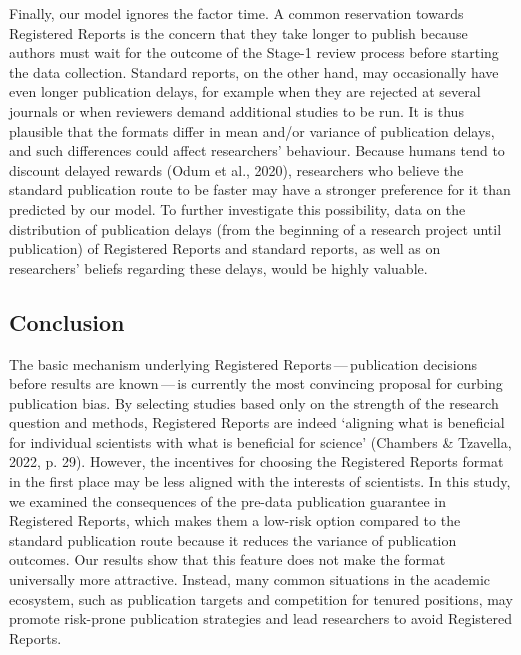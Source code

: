 \documentclass[
  ,man,mask,floatsintext]{apa6}
\begin{document}
Finally, our model ignores the factor time.
A common reservation towards Registered Reports is the concern that they take longer to publish because authors must wait for the outcome of the Stage-1 review process before starting the data collection.
Standard reports, on the other hand, may occasionally have even longer publication delays, for example when they are rejected at several journals or when reviewers demand additional studies to be run.
It is thus plausible that the formats differ in mean and/or variance of publication delays, and such differences could affect researchers' behaviour.
Because humans tend to discount delayed rewards (Odum et al., 2020), researchers who believe the standard publication route to be faster may have a stronger preference for it than predicted by our model.
To further investigate this possibility, data on the distribution of publication delays (from the beginning of a research project until publication) of Registered Reports and standard reports, as well as on researchers' beliefs regarding these delays, would be highly valuable.

\hypertarget{conclusion}{%
\subsection{Conclusion}\label{conclusion}}

The basic mechanism underlying Registered Reports\(\,\)---\(\,\)publication decisions before results are known\(\,\)---\(\,\)is currently the most convincing proposal for curbing publication bias.
By selecting studies based only on the strength of the research question and methods, Registered Reports are indeed `aligning what is beneficial for individual scientists with what is beneficial for science' (Chambers \& Tzavella, 2022, p. 29).
However, the incentives for choosing the Registered Reports format in the first place may be less aligned with the interests of scientists.
In this study, we examined the consequences of
the pre-data publication guarantee in Registered Reports, which makes them a low-risk option compared to the standard publication route because it reduces the variance of publication outcomes.
Our results show that this feature does not make the format universally more attractive.
Instead, many common situations in the academic ecosystem, such as publication targets and competition for tenured positions, may promote risk-prone publication strategies and lead researchers to avoid Registered Reports.
\end{document}
